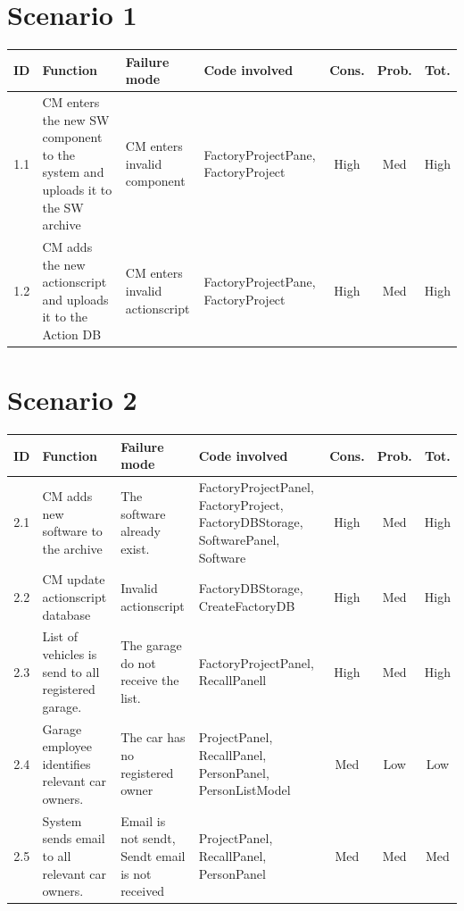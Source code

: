 	\begin{landscape}

	\section{Scenario 1}
			\begin{longtable}{ c | p{5cm} | p{5cm} | p{5cm} | c | c | c}
				\hline
				{\bf ID} & {\bf Function} & {\bf Failure mode} & {\bf Code involved} & 
				{\bf Cons.} & {\bf Prob.} & {\bf Tot.} \\ \hline
				1.1 
				& CM enters the new SW component to the system and uploads it to the SW archive
				& CM enters invalid component & FactoryProjectPane, FactoryProject
				& High & Med & High \\ \hline
				1.2 
				& CM adds the new actionscript and uploads it to the Action DB
				& CM enters invalid actionscript
				& FactoryProjectPane, FactoryProject 
				& High & Med & High \\ \hline
		\end{longtable}	

	\section{Scenario 2}

			\begin{longtable}{ c | p{5cm} | p{5cm} | p{5cm} | c | c | c}
				\hline
				{\bf ID} & {\bf Function} & {\bf Failure mode} & {\bf Code involved} & 
				{\bf Cons.} & {\bf Prob.} & {\bf Tot.} \\ \hline
				2.1 
				& CM adds new software to the archive
				& The software already exist. 
				& FactoryProjectPanel, FactoryProject, FactoryDBStorage, SoftwarePanel, Software
				& High & Med & High \\ \hline
				2.2 
				& CM update actionscript database
				& Invalid actionscript
				& FactoryDBStorage, CreateFactoryDB
				& High & Med & High \\ \hline
				2.3
				& List of vehicles is send to all registered garage.
				& The garage do not receive the list.
				& FactoryProjectPanel, RecallPanell
				& High & Med & High \\ \hline
				2.4
				& Garage employee identifies relevant car owners.
				& The car has no registered owner
				& ProjectPanel, RecallPanel, PersonPanel, PersonListModel
				& Med & Low & Low \\ \hline
				2.5
				& System sends email to all relevant car owners.
				& Email is not sendt, Sendt email is not received
				& ProjectPanel, RecallPanel, PersonPanel
				& Med & Med & Med \\ \hline
			

\end{longtable}
\end{landscape}

